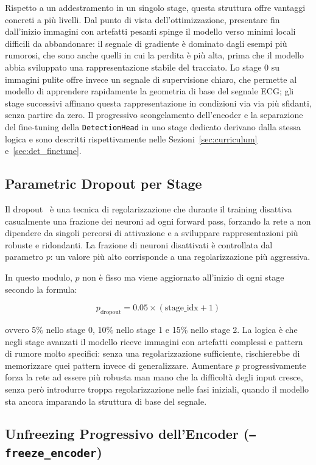 Rispetto a un addestramento in un singolo stage, questa struttura offre vantaggi concreti a più livelli. Dal punto di vista dell'ottimizzazione, presentare fin dall'inizio immagini con artefatti pesanti spinge il modello verso minimi locali difficili da abbandonare: il segnale di gradiente è dominato dagli esempi più rumorosi, che sono anche quelli in cui la perdita è più alta, prima che il modello abbia sviluppato una rappresentazione stabile del tracciato. Lo stage 0 su immagini pulite offre invece un segnale di supervisione chiaro, che permette al modello di apprendere rapidamente la geometria di base del segnale ECG; gli stage successivi affinano questa rappresentazione in condizioni via via più sfidanti, senza partire da zero. Il progressivo scongelamento dell'encoder e la separazione del fine-tuning della \texttt{DetectionHead} in uno stage dedicato derivano dalla stessa logica e sono descritti rispettivamente nelle Sezioni~\ref{sec:curriculum} e~\ref{sec:det_finetune}.

\subsection{Parametric Dropout per Stage}

Il dropout~\cite{JMLR:v15:srivastava14a} è una tecnica di regolarizzazione che durante il training disattiva casualmente una frazione dei neuroni ad ogni forward pass, forzando la rete a non dipendere da singoli percorsi di attivazione e a sviluppare rappresentazioni più robuste e ridondanti. La frazione di neuroni disattivati è controllata dal parametro $p$: un valore più alto corrisponde a una regolarizzazione più aggressiva.

In questo modulo, $p$ non è fisso ma viene aggiornato all'inizio di ogni stage secondo la formula:

\[
    p_{\text{dropout}} = 0.05 \times (\text{stage\_idx} + 1)
\]

ovvero 5\% nello stage 0, 10\% nello stage 1 e 15\% nello stage 2. La logica è che negli stage avanzati il modello riceve immagini con artefatti complessi e pattern di rumore molto specifici: senza una regolarizzazione sufficiente, rischierebbe di memorizzare quei pattern invece di generalizzare. Aumentare $p$ progressivamente forza la rete ad essere più robusta man mano che la difficoltà degli input cresce, senza però introdurre troppa regolarizzazione nelle fasi iniziali, quando il modello sta ancora imparando la struttura di base del segnale.

\subsection{Unfreezing Progressivo dell'Encoder (\texttt{--freeze\_encoder})}

